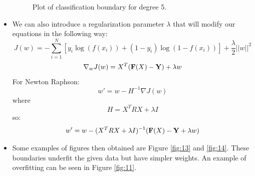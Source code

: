 \documentclass{article}
\begin{document}
\begin{itemize}
   \begin{figure}[H]
 \caption{Plot of classification boundary for degree 5.}
 \label{fig:12}
 \end{figure}
 
 \item We can also introduce a regularization parameter $\lambda$ that will modify our equations in the following way:
 $$J(w)=-\sum_{i=1}^N[y_i\log(f(x_i))+(1-y_i)\log(1-f(x_i))]+\frac \lambda 2||w||^2$$
 $$\nabla_wJ(w)=X^T({\bf F}(X)-{\bf Y})+\lambda w$$
For Newton Raphson:
 $$w' = w-H^{-1}\nabla J(w)$$
 where
 $$H=X^TRX+\lambda I$$
 so:
 $$w' = w - (X^TRX+\lambda I)^{-1}({\bf F}(X)-{\bf Y}+\lambda w)$$
 \item Some examples of figures then obtained are Figure \ref{fig:13} and \ref{fig:14}. These boundaries underfit the given data but have simpler weights. An example of overfitting can be seen in Figure \ref{fig:11}.
 

\end{itemize}
\end{document}
